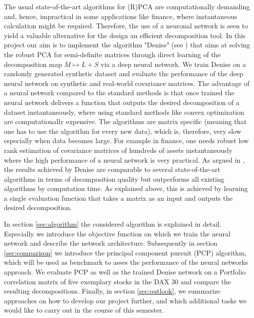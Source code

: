 The usual state-of-the-art algorithms for (R)PCA are computationally demanding and, hence, impractical in some applications like finance, where instantaneous calculation might be required. Therefore, the use of a neuronal network is seen to yield a valuable alternative for the design an efficient decomposition tool. In this project our aim is to implement the algorithm "Denise" (see \cite{herrera2020denise}) that aims at solving the robust PCA for semi-definite matrices through direct learning of the decomposition map $M\mapsto L+S$ via a deep neural network. We train Denise on a randomly generated synthetic dataset and evaluate the performance of the deep neural network on synthetic and real-world covariance matrices. The advantage of a neural network compared to the standard methods is that once trained the neural network delivers a function that outputs the desired decomposition of a dataset instantaneously, where using standard methods like convex optimization are computationally expensive. The algorithms are matrix specific (meaning that one has to use the algorithm for every new data), which is, therefore, very slow especially when data becomes large. For example in finance, one needs robust low rank estimation of covariance matrices of hundreds of assets instantaneously where the high performance of a neural network is very practical. As argued in \cite{herrera2020denise}, the results achieved by Denise are comparable to several state-of-the-art algorithms in terms of decomposition quality but outperforms all existing algorithms by computation time. As explained above, this is achieved by learning a single evaluation function that takes a matrix as an input and outputs the desired decomposition.

In section \ref{sec:algorithm} the considered algorithm is explained in detail. Especially we introduce the objective function on which we train the neural network and describe the network architecture. Subsequently in section \ref{sec:comparison} we introduce the principal component pursuit (PCP) algorithm, which will be used as benchmark to asses the performance of the neural networks approach. We evaluate PCP as well as the trained Denise network on a Portfolio correlation matrix of five exemplary stocks in the DAX 30 and compare the resulting decompositions. Finally, in section \ref{sec:outlook}, we summarize approaches on how to develop our project further, and which additional tasks we would like to carry out in the course of this semester.






